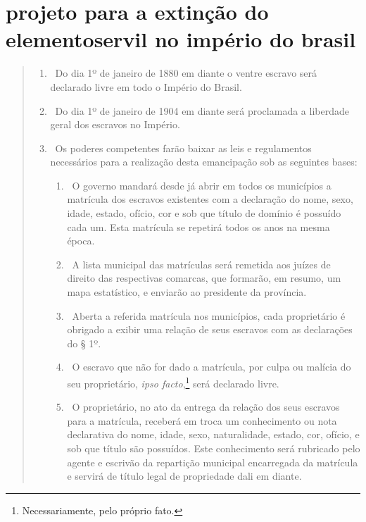 \section*{projeto para a extinção do elemento\break servil no império do brasil}

\begin{quote}
\begin{enumerate}[label=Art. \arabic*º]
\item\ Do dia 1º de janeiro de 1880 em diante o ventre escravo será
declarado livre em todo o Império do Brasil.

\item\ Do dia 1º de janeiro de 1904 em diante será proclamada a
liberdade geral dos escravos no Império.

\item\ Os poderes competentes farão baixar as leis e regulamentos
necessários para a realização desta emancipação sob as seguintes
bases:

\begin{enumerate}[label=§ \arabic*º]
\item\ O governo mandará desde já abrir em todos os municípios a
matrícula dos escravos existentes com a declaração do nome, sexo, idade,
estado, ofício, cor e sob que título de domínio é possuído cada um. Esta
matrícula se repetirá todos os anos na mesma época.

\item\ A lista municipal das matrículas será remetida aos juízes de
direito das respectivas comarcas, que formarão, em resumo, um mapa
estatístico, e enviarão ao presidente da província.

\item\ Aberta a referida matrícula nos municípios, cada proprietário é
obrigado a exibir uma relação de seus escravos com as declarações do § 1º.

\item\ O escravo que não for dado a matrícula, por culpa ou malícia do
seu proprietário, \emph{ipso facto},\footnote{Necessariamente, pelo
  próprio fato.} será declarado livre.

\item\ O proprietário, no ato da entrega da relação dos seus escravos
para a matrícula, receberá em troca um conhecimento ou nota declarativa
do nome, idade, sexo, naturalidade, estado, cor, ofício, e sob que
título são possuídos. Este conhecimento será rubricado pelo agente e
escrivão da repartição municipal encarregada da matrícula e servirá de
título legal de propriedade dali em diante.
\end{enumerate}


\end{enumerate}
\end{quote}
